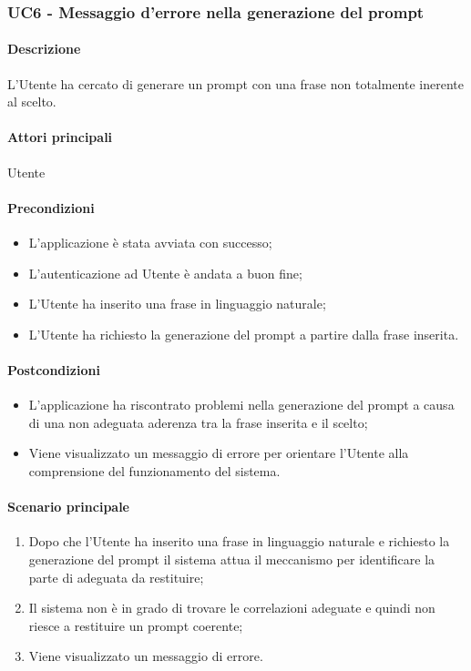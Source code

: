 \subsubsection{UC6 - Messaggio d'errore nella generazione del prompt}\label{UC6}
\paragraph*{Descrizione}
L’Utente ha cercato di generare un prompt con una frase non totalmente inerente al  scelto.

\paragraph*{Attori principali}
Utente

\paragraph*{Precondizioni}
\begin{itemize}
  \item L'applicazione è stata avviata con successo;
  \item L’autenticazione ad Utente è andata a buon fine;
  \item L’Utente ha inserito una frase in linguaggio naturale;
  \item L’Utente ha richiesto la generazione del prompt a partire dalla frase inserita.
\end{itemize}

\paragraph*{Postcondizioni}
\begin{itemize}
  \item L’applicazione ha riscontrato problemi nella generazione del prompt a causa di una non adeguata aderenza tra la frase inserita e il  scelto;
  \item Viene visualizzato un messaggio di errore per orientare l’Utente alla comprensione del funzionamento del sistema.
\end{itemize}

\paragraph*{Scenario principale}
\begin{enumerate}
  \item Dopo che l’Utente ha inserito una frase in linguaggio naturale e richiesto la generazione del prompt il sistema attua il meccanismo per identificare la parte di  adeguata da restituire;
  \item Il sistema non è in grado di trovare le correlazioni adeguate e quindi non riesce a restituire un prompt coerente;
  \item Viene visualizzato un messaggio di errore.
\end{enumerate}
